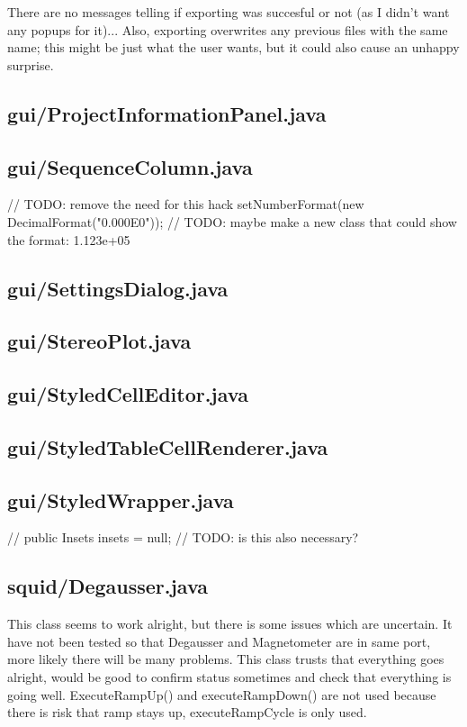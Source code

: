 There are no messages telling if exporting was succesful or not (as I didn't want any popups for it)... Also, exporting overwrites any previous files with the same name; this might be just what the user wants, but it could also cause an unhappy surprise.


\subsection{gui/ProjectInformationPanel.java}

\subsection{gui/SequenceColumn.java}
        // TODO: remove the need for this hack
            setNumberFormat(new DecimalFormat("0.000E0"));  // TODO: maybe make a new class that could show the format: 1.123e+05

\subsection{gui/SettingsDialog.java}

\subsection{gui/StereoPlot.java}

\subsection{gui/StyledCellEditor.java}

\subsection{gui/StyledTableCellRenderer.java}

\subsection{gui/StyledWrapper.java}
//        public Insets insets = null; // TODO: is this also necessary?

\subsection{squid/Degausser.java}

This class seems to work alright, but there is some issues which are uncertain. It have not been tested so that Degausser and Magnetometer are in same port, more likely there will be many problems. This class trusts that everything goes alright, would be good to confirm status sometimes and check that everything is going well. ExecuteRampUp() and executeRampDown() are not used because there is risk that ramp stays up, executeRampCycle is only used.

